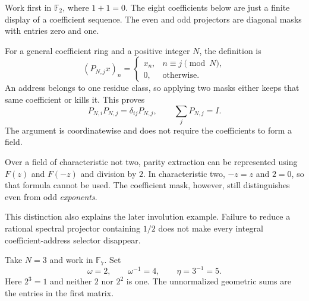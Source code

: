 Work first in $\mathbb F_2$, where $1+1=0$. The eight coefficients below are just a finite display of a coefficient sequence. The even and odd projectors are diagonal masks with entries zero and one.


For a general coefficient ring and a positive integer $N$, the definition is
\[
(P_{N,j}x)_n=\begin{cases}x_n,&n\equiv j\pmod N,\\0,&\text{otherwise}.\end{cases}
\]
An address belongs to one residue class, so applying two masks either keeps that same coefficient or kills it. This proves
\[
P_{N,i}P_{N,j}=\delta_{ij}P_{N,j},\qquad \sum_jP_{N,j}=I.
\]
The argument is coordinatewise and does not require the coefficients to form a field.

Over a field of characteristic not two, parity extraction can be represented using $F(z)$ and $F(-z)$ and division by $2$. In characteristic two, $-z=z$ and $2=0$, so that formula cannot be used. The coefficient mask, however, still distinguishes even from odd \emph{exponents}.

This distinction also explains the later involution example. Failure to reduce a rational spectral projector containing $1/2$ does not make every integral coefficient-address selector disappear.


Take $N=3$ and work in $\mathbb F_7$. Set
\[
\omega=2,\qquad \omega^{-1}=4,\qquad \eta=3^{-1}=5.
\]
Here $2^3=1$ and neither $2$ nor $2^2$ is one. The unnormalized geometric sums are the entries in the first matrix.


